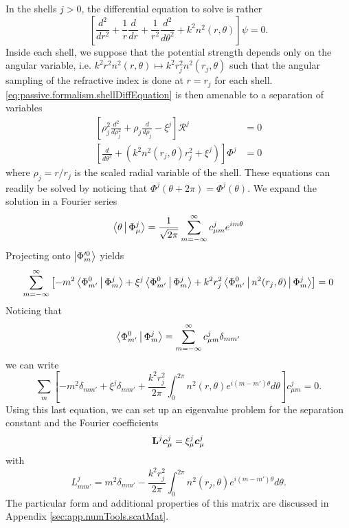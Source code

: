 In the shells $j>0$, the differential equation to solve is rather
  \begin{equation}
    \label{eq:passive.formalism.shellDiffEquation}
    \left[\frac{d^2}{dr^2}+\frac{1}{r}\frac{d}{dr}+\frac{1}{r^2}\frac{d^2}{d\theta^2}+k^2n^2(r,\theta)\right]\psi=0.
  \end{equation}
Inside each shell, we suppose that the potential strength depends only on the angular variable, i.e.
$k^2r^2n^2(r,\theta)\mapsto k^2r_j^2n^2(r_j,\theta)$ such that the angular sampling of the refractive
index is done at $r=r_j$ for each shell. \eqref{eq:passive.formalism.shellDiffEquation} 
is then amenable to a separation of variables
  \begin{subequations}
  \begin{align}
   \left[\rho_j^2\frac{d^2}{d\rho_j^2}+\rho_j\frac{d}{d\rho_j}-\xi^j\right]\mathcal{R}^j	&=0	\label{eq:passive.formalism.radialDiffEqn}	\\
   \left[\frac{d}{d\theta^2}+\left(k^2n^2(r_j,\theta)r_j^2+\xi^j\right)\right]\Phi^j		&=0
  \end{align}
  \end{subequations}
where $\rho_j=r/r_j$ is the scaled radial variable of the shell. 
These equations can readily be solved by noticing that
$\Phi^j(\theta+2\pi)=\Phi^j(\theta)$. We expand the solution
in a Fourier series
  \begin{equation}
   \Braket{\theta|\Phi_\mu^j} = \frac{1}{\sqrt{2\pi}}\sum_{m=-\infty}^\infty c_{\mu m}^je^{im\theta}
  \end{equation}
Projecting onto $\Ket{\Phi_m'^0}$ yields
\begin{equation}
    \sum_{m=-\infty}^\infty\left[-m^2\Braket{\Phi_{m'}^0|\Phi_m^j}+\xi^j\Braket{\Phi_{m'}^0|\Phi_m^j}+k^2r_j^2\Braket{\Phi_{m'}^0|n^2(r_j,\theta)|\Phi_m^j}\right]=0
  \end{equation}
Noticing that 
  \begin{equation}
    \Braket{\Phi_{m'}^0|\Phi_{m}^j} = \sum_{m=-\infty}^\infty c_{\mu m}^j \delta_{mm'}
  \end{equation}
we can write
  \begin{equation}
    \sum_m\left[-m^2\delta_{mm'}+\xi^j\delta_{mm'} + \frac{k^2r_j^2}{2\pi}\int_{0}^{2\pi}n^2(r,\theta)e^{i(m-m')\theta}d\theta\right]c_{\mu m}^j =0.
  \end{equation}
Using this last equation, we can set up an eigenvalue 
problem for the separation constant and the Fourier coefficients
  \begin{equation}
   \label{eq:passive.numerical.eigenvalue}
   \mathbf{L}^j\boldsymbol{c}_\mu^j=\xi_\mu^j\boldsymbol{c}_\mu^j
  \end{equation}
with
  \begin{equation}
    L_{mm'}^j = m^2\delta_{mm'}-\frac{k^2r_j^2}{2\pi}\int_0^{2\pi}n^2(r_j,\theta)e^{i(m-m')\theta}d\theta.
  \end{equation}
The particular form and additional properties of this matrix are discussed in 
Appendix \ref{sec:app.numTools.scatMat}.

